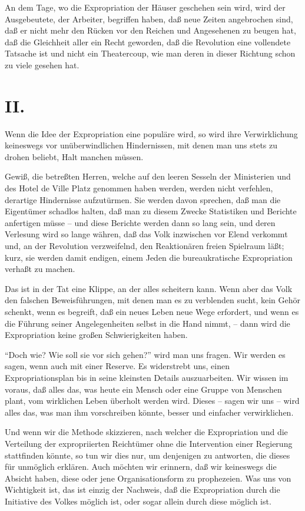 \documentclass{scrbook}
\begin{document}
An dem Tage, wo die Expropriation der Häuser geschehen sein wird, wird der Ausgebeutete, der Arbeiter, begriffen haben, daß neue Zeiten angebrochen sind, daß er nicht mehr den Rücken vor den Reichen und Angesehenen zu beugen hat, daß die Gleichheit aller ein Recht geworden, daß die Revolution eine vollendete Tatsache ist und nicht ein Theatercoup, wie man deren in dieser Richtung schon zu viele gesehen hat.

\section*{II.}

Wenn die Idee der Expropriation eine populäre wird, so wird ihre Verwirklichung keineswegs vor unüberwindlichen Hindernissen, mit denen man uns stets zu drohen beliebt, Halt manchen müssen.

Gewiß, die betreßten Herren, welche auf den leeren Sesseln der Ministerien und des Hotel de Ville Platz genommen haben werden, werden nicht verfehlen, derartige Hindernisse aufzutürmen. Sie werden davon sprechen, daß man die Eigentümer schadlos halten, daß man zu diesem Zwecke Statistiken und Berichte anfertigen müsse – und diese Berichte werden dann so lang sein, und deren Verlesung wird so lange währen, daß das Volk inzwischen vor Elend verkommt und, an der Revolution verzweifelnd, den Reaktionären freien Spielraum läßt; kurz, sie werden damit endigen, einem Jeden die bureaukratische Expropriation verhaßt zu machen.

Das ist in der Tat eine Klippe, an der alles scheitern kann. Wenn aber das Volk den falschen Beweisführungen, mit denen man es zu verblenden sucht, kein Gehör schenkt, wenn es begreift, daß ein neues Leben neue Wege erfordert, und wenn es die Führung seiner Angelegenheiten selbst in die Hand nimmt, – dann wird die Expropriation keine großen Schwierigkeiten haben.

``Doch wie? Wie soll sie vor sich gehen?'' wird man uns fragen. Wir werden es sagen, wenn auch mit einer Reserve. Es widerstrebt uns, einen Expropriationsplan bis in seine kleinsten Details auszuarbeiten. Wir wissen im voraus, daß alles das, was heute ein Mensch oder eine Gruppe von Menschen plant, vom wirklichen Leben überholt werden wird. Dieses – sagen wir uns – wird alles das, was man ihm vorschreiben könnte, besser und einfacher verwirklichen.

Und wenn wir die Methode skizzieren, nach welcher die Expropriation und die Verteilung der expropriierten Reichtümer ohne die Intervention einer Regierung stattfinden könnte, so tun wir dies nur, um denjenigen zu antworten, die dieses für unmöglich erklären. Auch möchten wir erinnern, daß wir keineswegs die Absicht haben, diese oder jene Organisationsform zu prophezeien. Was uns von Wichtigkeit ist, das ist einzig der Nachweis, daß die Expropriation durch die Initiative des Volkes möglich ist, oder sogar allein durch diese möglich ist.
\end{document}
